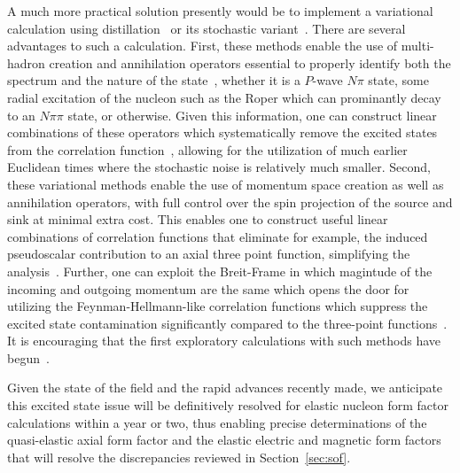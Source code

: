 A much more practical solution presently would be to implement a variational calculation using distillation~\cite{HadronSpectrum:2009krc} or its stochastic variant~\cite{Morningstar:2011ka}.
There are several advantages to such a calculation.
First, these methods enable the use of multi-hadron creation and annihilation operators
  essential to properly identify both the spectrum and the nature of the state~\cite{Dudek:2012xn,Lang:2012db},
 whether it is a $P$-wave $N\pi$ state,
 some radial excitation of the nucleon such as the Roper
 which can prominantly decay to an $N\pi\pi$ state,
 or otherwise.
Given this information, one can construct linear combinations of these operators which systematically remove the excited states from the correlation function~\cite{Blossier:2009kd}, allowing for the utilization of much earlier Euclidean times where the stochastic noise is relatively much smaller.
Second, these variational methods enable the use of momentum space creation as well as annihilation operators, with full control over the spin projection of the source and sink at minimal extra cost.
This enables one to construct useful linear combinations of correlation functions that eliminate for example, the induced pseudoscalar contribution to an axial three point function, simplifying the analysis~\cite{Meyer:2017ddy}.
Further, one can exploit the Breit-Frame in which magintude of the incoming and outgoing momentum are the same which opens the door for utilizing the Feynman-Hellmann-like correlation functions which suppress the excited state contamination significantly compared to the three-point functions~\cite{He:2021yvm}.
It is encouraging that the first exploratory calculations with such methods have begun~\cite{Egerer:2018xgu,Barca:2021iak}.

Given the state of the field and the rapid advances recently made, we anticipate this excited state issue will be definitively resolved for elastic nucleon form factor calculations within a year or two, thus enabling precise determinations of the quasi-elastic axial form factor and the elastic electric and magnetic form factors that will resolve the discrepancies reviewed in Section~\ref{sec:sof}.


